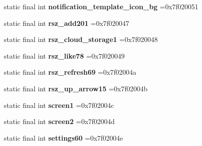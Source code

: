 \begin{DoxyCompactItemize}
\item 
\hypertarget{classcheck_1_1test_1_1_r_1_1drawable_aa8bfd3f3861d778f5b1ecf18faaef23c}{}static final int {\bfseries notification\+\_\+template\+\_\+icon\+\_\+bg} =0x7f020051\label{classcheck_1_1test_1_1_r_1_1drawable_aa8bfd3f3861d778f5b1ecf18faaef23c}

\item 
\hypertarget{classcheck_1_1test_1_1_r_1_1drawable_a3c2cfa35b2bf8bb7492893865ac8bcab}{}static final int {\bfseries rsz\+\_\+add201} =0x7f020047\label{classcheck_1_1test_1_1_r_1_1drawable_a3c2cfa35b2bf8bb7492893865ac8bcab}

\item 
\hypertarget{classcheck_1_1test_1_1_r_1_1drawable_a229de76ba478c563025d177c55ae4d6b}{}static final int {\bfseries rsz\+\_\+cloud\+\_\+storage1} =0x7f020048\label{classcheck_1_1test_1_1_r_1_1drawable_a229de76ba478c563025d177c55ae4d6b}

\item 
\hypertarget{classcheck_1_1test_1_1_r_1_1drawable_a54f652fb0873d469f6a60ce86287b4aa}{}static final int {\bfseries rsz\+\_\+like78} =0x7f020049\label{classcheck_1_1test_1_1_r_1_1drawable_a54f652fb0873d469f6a60ce86287b4aa}

\item 
\hypertarget{classcheck_1_1test_1_1_r_1_1drawable_a0f5955b2b95d8131cb2d0c01bd63084a}{}static final int {\bfseries rsz\+\_\+refresh69} =0x7f02004a\label{classcheck_1_1test_1_1_r_1_1drawable_a0f5955b2b95d8131cb2d0c01bd63084a}

\item 
\hypertarget{classcheck_1_1test_1_1_r_1_1drawable_a2b11df786eabf870249b191f1be873bf}{}static final int {\bfseries rsz\+\_\+up\+\_\+arrow15} =0x7f02004b\label{classcheck_1_1test_1_1_r_1_1drawable_a2b11df786eabf870249b191f1be873bf}

\item 
\hypertarget{classcheck_1_1test_1_1_r_1_1drawable_af806031d1e878ccd54f6a2793a9dcac0}{}static final int {\bfseries screen1} =0x7f02004c\label{classcheck_1_1test_1_1_r_1_1drawable_af806031d1e878ccd54f6a2793a9dcac0}

\item 
\hypertarget{classcheck_1_1test_1_1_r_1_1drawable_a04f7de1475131a52a50e33419f0094b0}{}static final int {\bfseries screen2} =0x7f02004d\label{classcheck_1_1test_1_1_r_1_1drawable_a04f7de1475131a52a50e33419f0094b0}

\item 
\hypertarget{classcheck_1_1test_1_1_r_1_1drawable_a2ad50ac064ec87fe119ab598401111c3}{}static final int {\bfseries settings60} =0x7f02004e\label{classcheck_1_1test_1_1_r_1_1drawable_a2ad50ac064ec87fe119ab598401111c3}


\end{DoxyCompactItemize}
